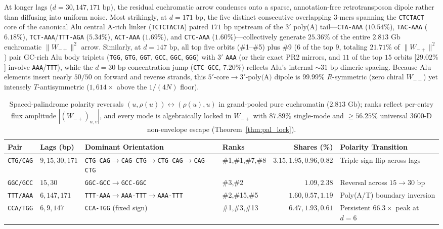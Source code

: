 \documentclass[11pt,a4paper]{article}
\newcommand{\Wmp}{W_{-+}}
\newcommand{\Wmm}{W_{--}}
\begin{document}
At longer lags ($d=30, 147, 171\text{ bp}$), the residual euchromatic arrow condenses onto a sparse, annotation-free retrotransposon dipole rather than diffusing into uniform noise. Most strikingly, at $d=171\text{ bp}$, the five distinct consecutive overlapping 3-mers spanning the \texttt{CTCTACT} core of the canonical Alu central A-rich linker (\texttt{TCTCTACTA}) paired $171\text{ bp}$ upstream of the $3'$ poly(A) tail---\texttt{CTA-AAA} ($10.54\%$), \texttt{TAC-AAA} ($6.18\%$), \texttt{TCT-AAA}/\texttt{TTT-AGA} ($5.34\%$), \texttt{ACT-AAA} ($1.69\%$), and \texttt{CTC-AAA} ($1.60\%$)---collectively generate $\mathbf{25.36\%}$ of the entire $2.813\text{ Gb}$ euchromatic $\|\Wmp\|^2$ arrow. Similarly, at $d=147\text{ bp}$, all top five orbits (\#1--\#5) plus \#9 ($6$ of the top $9$, totaling $21.71\%$ of $\|\Wmp\|^2$) pair GC-rich Alu body triplets (\texttt{TGG}, \texttt{GTG}, \texttt{GGT}, \texttt{GCC}, \texttt{GGC}, \texttt{GGG}) with $3'$ \texttt{AAA} (or their exact PR2 mirrors, and $11$ of the top $15$ orbits [$29.02\%$] involve \texttt{AAA}/\texttt{TTT}), while the $d=30\text{ bp}$ concentration jump (\texttt{CTC-GCC}, $7.20\%$) reflects Alu's internal $\sim 31\text{ bp}$ dimeric spacing. Because Alu elements insert nearly $50/50$ on forward and reverse strands, this $5'\text{-core}\to 3'\text{-poly(A)}$ dipole is $99.99\%$ $R$-symmetric (zero chiral $\Wmm$) yet intensely $T$-antisymmetric ($1{,}614\times$ above the $1/(4N)$ floor).

\begin{table}[htbp]
\centering
\caption{Spaced-palindrome polarity reversals $(u,\rho(u)) \leftrightarrow (\rho(u),u)$ in grand-pooled pure euchromatin ($2.813\text{ Gb}$); ranks reflect per-entry flux amplitude $|(\Wmp)_{u,v}|$, and every mode is algebraically locked in $\Wmp$ with $87.89\%$ single-mode and $\ge 56.25\%$ universal 3600-D non-envelope escape (Theorem~\ref{thm:pal_lock}).}
\label{tab:pal_flips}
\scriptsize
\setlength{\tabcolsep}{3.4pt}
\begin{tabularx}{\textwidth}{@{}llllrX@{}}
\toprule
\textbf{Pair} & \textbf{Lags (bp)} & \textbf{Dominant Orientation} & \textbf{Ranks} & \textbf{Shares (\%)} & \textbf{Polarity Transition} \\
\midrule
\texttt{CTG/CAG} & $9,15,30,171$ & \texttt{CTG-CAG}$\to$\texttt{CAG-CTG}$\to$\texttt{CTG-CAG}$\to$\texttt{CAG-CTG} & \#1,\#1,\#7,\#8 & $3.15,1.95,0.96,0.82$ & Triple sign flip across lags \\
\texttt{GGC/GCC} & $15,30$ & \texttt{GGC-GCC}$\to$\texttt{GCC-GGC} & \#3,\#2 & $1.09,2.38$ & Reversal across $15\to 30\text{ bp}$ \\
\texttt{TTT/AAA} & $6,147,171$ & \texttt{TTT-AAA}$\to$\texttt{AAA-TTT}$\to$\texttt{AAA-TTT} & \#2,\#15,\#5 & $1.60,0.57,1.19$ & Poly(A/T) boundary inversion \\
\texttt{CCA/TGG} & $6,9,147$ & \texttt{CCA-TGG} (fixed sign) & \#1,\#3,\#13 & $6.47,1.93,0.61$ & Persistent $66.3\times$ peak at $d=6$ \\
\bottomrule
\end{tabularx}
\end{table}
\end{document}

